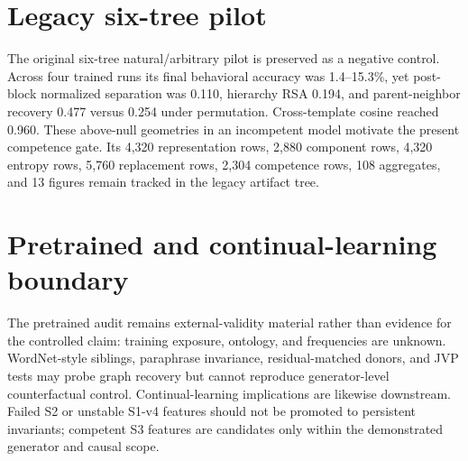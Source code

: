 \documentclass[10pt]{article}
\begin{document}
\appendix
\section{Legacy six-tree pilot}
The original six-tree natural/arbitrary pilot is preserved as a negative control. Across four trained runs its final behavioral accuracy was 1.4--15.3\%, yet post-block normalized separation was 0.110, hierarchy RSA 0.194, and parent-neighbor recovery 0.477 versus 0.254 under permutation. Cross-template cosine reached 0.960. These above-null geometries in an incompetent model motivate the present competence gate. Its 4,320 representation rows, 2,880 component rows, 4,320 entropy rows, 5,760 replacement rows, 2,304 competence rows, 108 aggregates, and 13 figures remain tracked in the legacy artifact tree.

\section{Pretrained and continual-learning boundary}
The pretrained audit remains external-validity material rather than evidence for the controlled claim: training exposure, ontology, and frequencies are unknown. WordNet-style siblings, paraphrase invariance, residual-matched donors, and JVP tests may probe graph recovery but cannot reproduce generator-level counterfactual control. Continual-learning implications are likewise downstream. Failed S2 or unstable S1-v4 features should not be promoted to persistent invariants; competent S3 features are candidates only within the demonstrated generator and causal scope.
\end{document}

